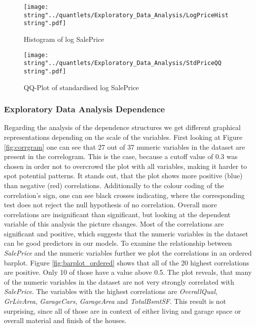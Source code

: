 \begin{figure}[H]
  \centering
\texttt{[image: \\string"../quantlets/Exploratory\_Data\_Analysis/LogPriceHist\\string".pdf]}
  \caption{Histogram of log SalePrice}\label{fig:logpricehist}
\end{figure}

\begin{figure}[H]
  \centering
\texttt{[image: \\string"../quantlets/Exploratory\_Data\_Analysis/StdPriceQQ\\string".pdf]}
  \caption{QQ-Plot of standardised log SalePrice}\label{fig:stdpriceqq}
\end{figure}




\subsubsection{Exploratory Data Analysis Dependence}
Regarding the analysis of the dependence structures we get different graphical representations depending on the scale of the variables. First looking at Figure \ref{fig:corrgram} one can see that 27 out of 37 numeric variables in the dataset are present in the correlogram. This is the case, because a cutoff value of 0.3 was chosen in order not to overcrowd the plot with all variables, making it harder to spot potential patterns. It stands out, that the plot shows more positive (blue) than negative (red) correlations. Additionally to the colour coding of the correlation's sign, one can see black crosses indicating, where the corresponding test does not reject the null hypothesis of no correlation. Overall more correlations are insignificant than significant, but looking at the dependent variable of this analysis the picture changes. Most of the correlations are significant and positive, which suggests that the numeric variables in the dataset can be good predictors in our models. To examine the relationship between \textit{SalePrice} and the numeric variables further we plot the correlations in an ordered barplot. Figure \ref{fig:barplot_ordered} shows that all of the 20 highest correlations are positive. Only 10 of those have a value above 0.5. The plot reveals, that many of the numeric variables in the dataset are not very strongly correlated with \textit{SalePrice}. The variables with the highest correlations are \textit{OverallQual}, \textit{GrLivArea}, \textit{GarageCars}, \textit{GarageArea} and \textit{TotalBsmtSF}. This result is not surprising, since all of those are in context of either living and garage space or overall material and finish of the houses.

